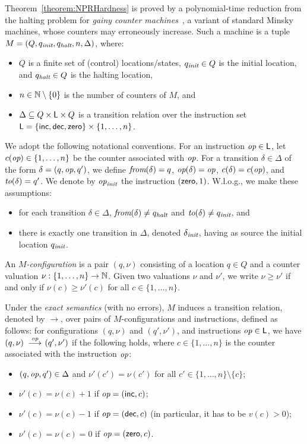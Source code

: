 Theorem~\ref{theorem:NPRHardness} is proved by a polynomial-time reduction from the halting problem for \emph{gainy counter machines}~\cite{DemriL09}, a variant of standard Minsky machines, whose counters may erroneously  increase. Such a machine is a tuple $M = (Q,q_{\textit{init}},q_{\textit{halt}},n, \Delta)$,
where:
%
\begin{itemize}
  \item  $Q$ is a finite set of (control) locations/states, $q_{\textit{init}}\in Q$ is the initial location, and $q_{\textit{halt}}\in Q$ is the halting location,
  \item  $n\in\mathbb{N}\setminus\{0\}$ is the number of counters of $M$, and
  \item $\Delta \subseteq Q\times \mathsf{L} \times Q$ is a transition relation over the instruction set $\mathsf{L}= \{{\mathsf{inc}},{\mathsf{dec}},\allowbreak {\mathsf{zero}}\}\times \{1,\ldots,n\}$.
\end{itemize}%
%
We adopt the following notational conventions.
 For an instruction
${\textit{op}}\in \mathsf{L}$, let $c({\textit{op}})\in\{1,\ldots,n\}$ be the counter associated with ${\textit{op}}$.
For a transition $\delta\in \Delta$ of the form $\delta=(q,{\textit{op}},q')$, we define ${\textit{from}}(\delta)= q$, ${\textit{op}}(\delta)={\textit{op}}$, $c(\delta)= c({\textit{op}})$,
and ${\textit{to}}(\delta)= q'$.  We denote by ${\textit{op}}_{\textit{init}}$ the instruction $({\mathsf{zero}},1)$.
%
W.l.o.g., we make these assumptions:
\begin{itemize}
  \item for each transition $\delta\in \Delta$, ${\textit{from}}(\delta)\neq q_{\textit{halt}}$ and ${\textit{to}}(\delta )\neq q_{\textit{init}}$, and
    \item there is exactly one transition in $\Delta$, denoted $\delta_{\textit{init}}$, having as source the initial location $q_{\textit{init}}$.
\end{itemize}%

An \emph{$M$-configuration} is a pair $(q,\nu)$ consisting of a location $q\in Q$ and a counter valuation $\nu: \{1,\ldots,n\}\to \mathbb{N}$. Given
two valuations $\nu$ and $\nu'$, we write $\nu\geq \nu'$ if and only if $\nu(c)\geq \nu'(c)$ for all $c\in\{1,\ldots,n\}$.


Under the \emph{exact semantics} (with no errors), $M$ induces a transition relation, denoted by $\longrightarrow$, over pairs of $M$-configurations and instructions, defined as follows:
 for configurations $(q,\nu)$ and $(q',\nu')$, and instructions ${\textit{op}} \in \mathsf{L}$, we have $(q,\nu) \;\;{\mathop{{ \longrightarrow}}\limits^{{{\textit{op}}}}}\!\;\; (q',\nu')$ if the following holds, where $c\in \{1,\ldots,n\}$ is the counter associated with the instruction
 ${\textit{op}}$:
\begin{itemize}
  \item  $(q,{\textit{op}},q')\in \Delta$ and $\nu'(c')= \nu(c')$ for all $c'\in \{1,\ldots,n\}\setminus\{c\}$;
  \item  $\nu'(c)= \nu(c) +1$ if ${\textit{op}}=({\mathsf{inc}},c)$;
  \item $\nu'(c)= \nu(c) -1$ if ${\textit{op}}=({\mathsf{dec}},c)$ (in particular, it has to be $v(c)>0$);
   \item  $\nu'(c)= \nu(c)=0$ if ${\textit{op}}=({\mathsf{zero}},c)$.
\end{itemize}%

